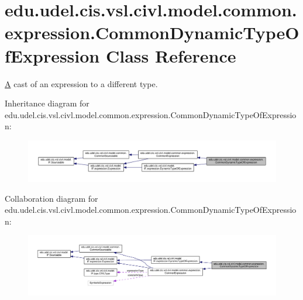 \hypertarget{classedu_1_1udel_1_1cis_1_1vsl_1_1civl_1_1model_1_1common_1_1expression_1_1CommonDynamicTypeOfExpression}{}\section{edu.\+udel.\+cis.\+vsl.\+civl.\+model.\+common.\+expression.\+Common\+Dynamic\+Type\+Of\+Expression Class Reference}
\label{classedu_1_1udel_1_1cis_1_1vsl_1_1civl_1_1model_1_1common_1_1expression_1_1CommonDynamicTypeOfExpression}


\hyperlink{structA}{A} cast of an expression to a different type.  




Inheritance diagram for edu.\+udel.\+cis.\+vsl.\+civl.\+model.\+common.\+expression.\+Common\+Dynamic\+Type\+Of\+Expression\+:
\nopagebreak
\begin{figure}[H]
\begin{center}
\leavevmode
\includegraphics[width=350pt]{classedu_1_1udel_1_1cis_1_1vsl_1_1civl_1_1model_1_1common_1_1expression_1_1CommonDynamicTypeOfExpression__inherit__graph}
\end{center}
\end{figure}


Collaboration diagram for edu.\+udel.\+cis.\+vsl.\+civl.\+model.\+common.\+expression.\+Common\+Dynamic\+Type\+Of\+Expression\+:
\nopagebreak
\begin{figure}[H]
\begin{center}
\leavevmode
\includegraphics[width=350pt]{classedu_1_1udel_1_1cis_1_1vsl_1_1civl_1_1model_1_1common_1_1expression_1_1CommonDynamicTypeOfExpression__coll__graph}
\end{center}
\end{figure}
